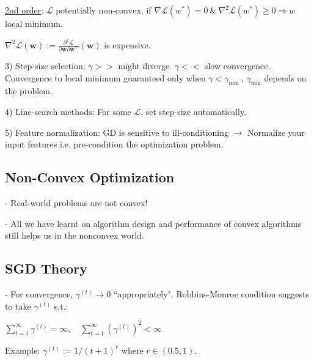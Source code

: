 \underline{2nd order}:
$\mathcal{L} \text{ potentially non-convex, if } \nabla \mathcal{L}(w^*)=0 \ \& \ \nabla^2 \mathcal{L}(w^*) \geq 0 \Rightarrow w$ local minimum.

$\nabla^{2} \mathcal{L}(\mathbf{w}):=\frac{\partial^{2} \mathcal{L}}{\partial \mathbf{w} \partial \mathbf{w}^{\top}}(\mathbf{w})$ is expensive.

3) Step-size selection: $\gamma >>$ might diverge. $\gamma <<$ slow convergence. Convergence to local minimum guaranteed only when $\gamma<\gamma_{\text {min }}$, $\gamma_{\min }$ depends on the problem.

4) Line-search methods: For some $\mathcal{L}$, set step-size automatically.

5) Feature normalization: 
GD is sensitive to ill-conditioning $\rightarrow$ Normalize your input features i.e. pre-condition the optimization problem. 

\subsection*{Non-Convex Optimization}

- Real-world problems are not convex!

- All we have learnt on algorithm design and performance of convex algorithms still helps us in the nonconvex world.

\subsection*{SGD Theory}
- For convergence, $\gamma^{(t)} \rightarrow 0$ ``appropriately". Robbins-Monroe condition suggests to take $\gamma^{(t)}$ s.t.:

$
\sum_{t=1}^{\infty} \gamma^{(t)}=\infty, \quad \sum_{t=1}^{\infty}\left(\gamma^{(t)}\right)^{2}<\infty
$

Example: $\gamma^{(t)}:=1 /(t+1)^{r}$ where $r \in(0.5,1)$.